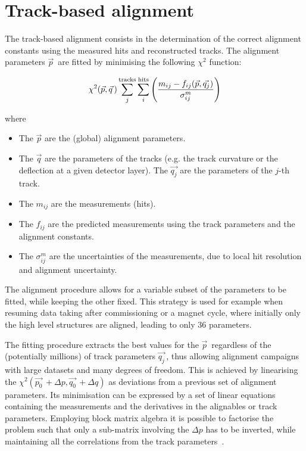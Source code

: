 \section{Track-based alignment}
The track-based alignment consists in the determination of the correct alignment constants using the measured hits and reconstructed tracks.
The alignment parameters $\vec{p}\,$ are fitted by minimising the following $\chi^2$ function:

\begin{equation}
  \chi^2(\vec{p}, \vec{q}\,) \sum_j^{\rm tracks} \sum_i^{\rm hits} \left( \frac{m_{ij} - f_{ij}(\vec{p}, \vec{q_j})}{\sigma_{ij}^{m}} \right)
\end{equation}

where
\begin{itemize}
  \item The $\vec{p}$ are the (global) alignment parameters.
  \item The $\vec{q}$ are the parameters of the tracks (e.g. the track curvature or the deflection at a given detector layer).
    The $\vec{q_j}$ are the parameters of the $j$-th track.
  \item The $m_{ij}$ are the measurements (hits).
  \item The $f_{ij}$ are the predicted measurements using the track parameters and the alignment constants.
  \item The $\sigma^m_{ij}$ are the uncertainties of the measurements, due to local hit resolution and alignment uncertainty.
\end{itemize}

The alignment procedure allows for a variable subset of the parameters to be fitted, while keeping the other fixed.
This strategy is used for example when resuming data taking after commissioning or a magnet cycle, where initially only the high level structures are aligned,
leading to only 36 parameters.

The fitting procedure extracts the best values for the $\vec{p}\,$ regardless of the (potentially millions) of track parameters $\vec{q_j}\,$,
thus allowing alignment campaigns with large datasets and many degrees of freedom.
This is achieved by linearising the $\chi^2(\vec{p_0}\,+\Delta p, \vec{q_0}\,+\Delta q)$ as deviations from a previous set of alignment parameters.
Its minimisation can be expressed by a set of linear equations containing the measurements and the derivatives in the alignables or track parameters.
Employing block matrix algebra it is possible to factorise the problem such that only a sub-matrix involving the $\Delta p$ has to be inverted,
while maintaining all the correlations from the track parameters~\cite{blobel2002new}.

